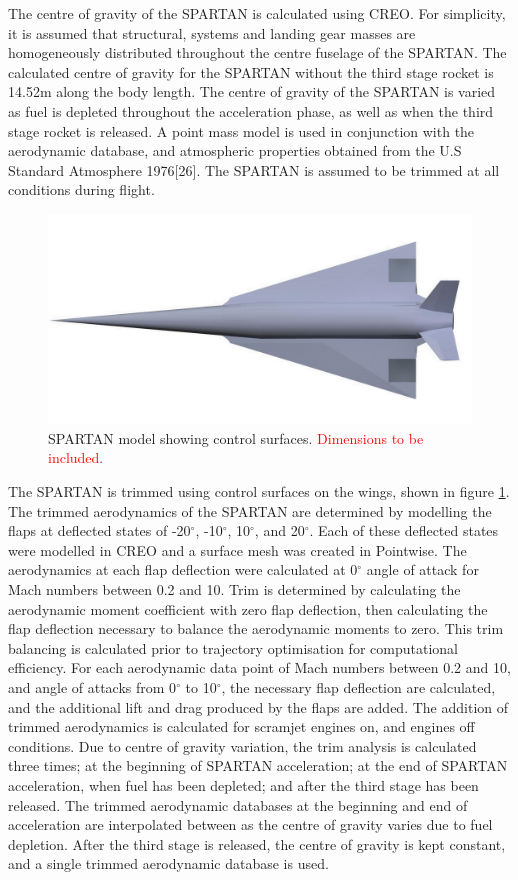 		The centre of gravity of the SPARTAN is calculated using CREO. For simplicity, it is assumed that structural, systems and landing gear masses are homogeneously distributed throughout the centre fuselage of the SPARTAN. The calculated centre of gravity for the SPARTAN without the third stage rocket is 14.52m along the body length. 
		The centre of gravity of the SPARTAN is varied as fuel is depleted throughout the acceleration phase, as well as when the third stage rocket is released. A point mass model is used in conjunction with the aerodynamic database,
		and atmospheric properties obtained from the U.S Standard Atmosphere 1976[26]. The SPARTAN is assumed to be
		trimmed at all conditions during flight.
		\begin{figure}
			\centering
			\includegraphics[width=0.6\linewidth]{figures/3_vehicle_design/SPARTAN_FLAPS}
			\caption{SPARTAN model showing control surfaces. \textcolor{red}{Dimensions to be included.}}
			\label{fig:SPARTAN_FLAPS}
		\end{figure}
		The SPARTAN is trimmed using control surfaces on the wings, shown in figure \ref{fig:SPARTAN_FLAPS}. 
		The trimmed aerodynamics of the SPARTAN are determined by modelling the flaps at deflected states of -20$^\circ$, -10$^\circ$, 10$^\circ$, and 20$^\circ$. Each of these deflected states were modelled in CREO and a surface mesh was created in Pointwise. The aerodynamics at each flap deflection were calculated at 0$^\circ$ angle of attack for Mach numbers between 0.2 and 10. Trim is determined by calculating the aerodynamic moment coefficient with zero flap deflection, then calculating the flap deflection necessary to balance the aerodynamic moments to zero. This trim balancing is calculated prior to trajectory optimisation for computational efficiency. For each aerodynamic data point of Mach numbers between 0.2 and 10, and angle of attacks from 0$^\circ$ to 10$^\circ$, the necessary flap deflection are calculated, and the additional lift and drag produced by the flaps are added. The addition of trimmed aerodynamics is calculated for scramjet engines on, and engines off conditions. Due to centre of gravity variation, the trim analysis is calculated three times; at the beginning of SPARTAN acceleration; at the end of SPARTAN acceleration, when fuel has been depleted; and after the third stage has been released. The trimmed aerodynamic databases at the beginning and end of acceleration are interpolated between as the centre of gravity varies due to fuel depletion. After the third stage is released, the centre of gravity is kept constant, and a single trimmed aerodynamic database is used. 
		
